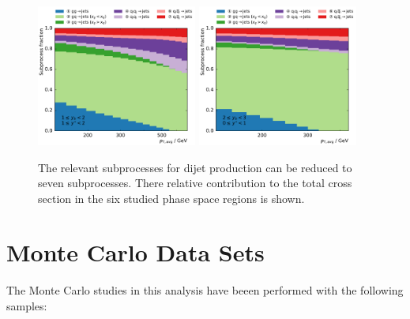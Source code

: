 \begin{figure}[H]
    \includegraphics[width=0.47\textwidth]{figures/theory/subprocesses_yb1ys1.pdf}\hfill
    \includegraphics[width=0.47\textwidth]{figures/theory/subprocesses_yb2ys0.pdf}\hfill
    \caption[Subprocess of Dijet Production]{The relevant subprocesses for dijet
        production can be reduced to seven subprocesses. There relative
        contribution to the total cross section in the six studied phase space
        regions is shown.}
    \label{fig:subprocess_fractions}
\end{figure}
\clearpage

\section{Monte Carlo Data Sets}

The Monte Carlo studies in this analysis have beeen performed with the following samples:

